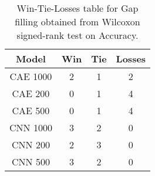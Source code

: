 \begin{table}
\centering
\caption{Win-Tie-Losses table for Gap filling obtained from Wilcoxon signed-rank test on Accuracy.}
\label{tab:gap_filling_model_training_data_comparison_Accuracy}
\begin{tabular}{|c|c|c|c|}
\toprule
\textbf{Model} &  \textbf{Win} &  \textbf{Tie} &  \textbf{Losses} \\
\midrule
      CAE 1000 &             2 &             1 &                2 \\
       CAE 200 &             0 &             1 &                4 \\
       CAE 500 &             0 &             1 &                4 \\
      CNN 1000 &             3 &             2 &                0 \\
       CNN 200 &             2 &             3 &                0 \\
       CNN 500 &             3 &             2 &                0 \\
\bottomrule
\end{tabular}
\end{table}
